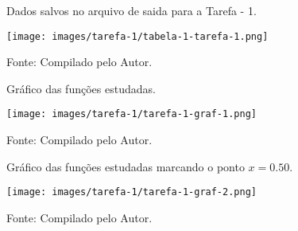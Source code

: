 \begin{figure}[h!]
\centering
\caption{Dados salvos no arquivo de saida para a Tarefa - 1.}
\centering
\texttt{[image: images/tarefa-1/tabela-1-tarefa-1.png]}
\caption*{Fonte: Compilado pelo Autor.}
\label{fig:tarefa 1 - Tabela 1}
\end{figure}


\begin{figure}[H]
\centering
\caption{Gráfico das funções estudadas.}
\centering
\texttt{[image: images/tarefa-1/tarefa-1-graf-1.png]}
\caption*{Fonte: Compilado pelo Autor.}
\label{fig:tarefa 1 - Gráfico 1}
\end{figure}

\begin{figure}[H]
\centering
\caption{Gráfico das funções estudadas marcando o ponto $x=0.50$.}
\centering
\texttt{[image: images/tarefa-1/tarefa-1-graf-2.png]}
\caption*{Fonte: Compilado pelo Autor.}
\label{fig:tarefa 1 - Gráfico 2}
\end{figure}

